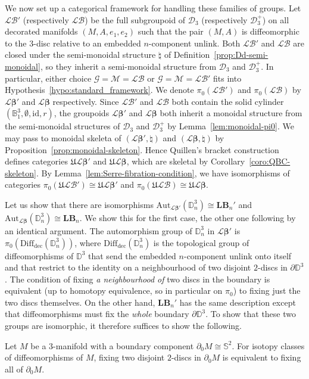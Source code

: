 \documentclass[AHL,Unicode,published]{cedram}
\newcommand{\Diff}{\mathrm{Diff}}
\newcommand{\Aut}{\mathrm{Aut}}
\newcommand{\id}{\mathrm{id}}
\newcommand{\rdec}{\mathrm{dec}}
\newcommand{\lB}{\mathbf{LB}}
\newcommand{\fU}{\ensuremath{\mathfrak{U}}}
\newcommand{\cB}{\mathcal{B}}
\newcommand{\cD}{\mathcal{D}}
\newcommand{\cG}{\mathcal{G}}
\newcommand{\cL}{\mathcal{L}}
\newcommand{\cM}{\mathcal{M}}
\newcommand{\bB}{\mathbb{B}}
\newcommand{\bD}{\mathbb{D}}
\newcommand{\bS}{\mathbb{S}}
\newcommand{\Beta}{\boldsymbol{\beta}}
\begin{document}
We now set up a categorical framework for handling these families of groups. Let $\cL\cB'$ (respectively $\cL\cB$) be the full subgroupoid of $\cD_3$ (respectively $\cD_3^{+}$) on all decorated manifolds $(M,A,e_{1},e_{2})$ such that the pair $(M,A)$ is diffeomorphic to the $3$-disc relative to an embedded $n$-component unlink. Both $\cL\cB'$ and $\cL\cB$ are closed under the semi-monoidal structure $\natural$ of Definition~\ref{prop:Dd-semi-monoidal}, so they inherit a semi-monoidal structure from $\cD_3$ and $\cD_3^{+}$. In particular, either choice $\cG = \cM = \cL\cB$ or $\cG = \cM = \cL\cB'$ fits into Hypothesis~\ref{hypo:standard_framework}. We denote $\pi_{0}(\cL\cB')$ and $\pi_{0}(\cL\cB)$ by $\cL\Beta'$ and $\cL\Beta$ respectively. Since $\cL\cB'$ and $\cL\cB$ both contain the solid cylinder $(\bB^3_{1},\emptyset,\id,r)$, the groupoids $\cL\Beta'$ and $\cL\Beta$ both inherit a monoidal structure from the semi-monoidal structures of $\cD_3$ and $\cD_3^{+}$ by Lemma~\ref{lem:monoidal-pi0}. We may pass to monoidal skeleta of $(\cL\Beta',\natural)$ and $(\cL\Beta,\natural)$ by Proposition~\ref{prop:monoidal-skeleton}. Hence Quillen's bracket construction defines categories $\fU\cL\Beta'$ and $\fU\cL\Beta$, which are skeletal by Corollary~\ref{coro:QBC-skeleton}. By Lemma~\ref{lem:Serre-fibration-condition}, we have isomorphisms of categories $\pi_{0}(\fU\cL\cB') \cong \fU\cL\Beta'$ and $\pi_{0}(\fU\cL\cB) \cong \fU\cL\Beta$.

Let us show that there are isomorphisms $\Aut_{\cL\Beta'}(\bD^{3}_{n}) \cong \lB_{n}'$ and $\Aut_{\cL\Beta}(\bD^{3}_{n}) \cong \lB_{n}$. We show this for the first case, the other one following by an identical argument. The automorphism group of $\bD^{3}_{n}$ in $\cL\Beta'$ is $\pi_{0}(\Diff_{\rdec}(\bD^{3}_{n}))$, where $\Diff_{\rdec}(\bD^{3}_{n})$ is the topological group of diffeomorphisms of $\bD^{3}$ that send the embedded $n$-component unlink onto itself and that restrict to the identity on a neighbourhood of two disjoint $2$-discs in $\partial \bD^{3}$. The condition of fixing \emph{a neighbourhood of} two discs in the boundary is equivalent (up to homotopy equivalence, so in particular on $\pi_{0}$) to fixing just the two discs themselves. On the other hand, $\lB_{n}'$ has the same description except that diffeomorphisms must fix the \emph{whole} boundary $\partial \bD^{3}$. To show that these two groups are isomorphic, it therefore suffices to show the following.

\begin{lemm}\label{lem:loop-braid}
Let $M$ be a $3$-manifold with a boundary component $\partial_{0} M\cong \bS^{2}$. For isotopy classes of diffeomorphisms of $M$, fixing two disjoint $2$-discs in $\partial_{0} M$ is equivalent to fixing all of $\partial_{0} M$.
\end{lemm}
\end{document}
